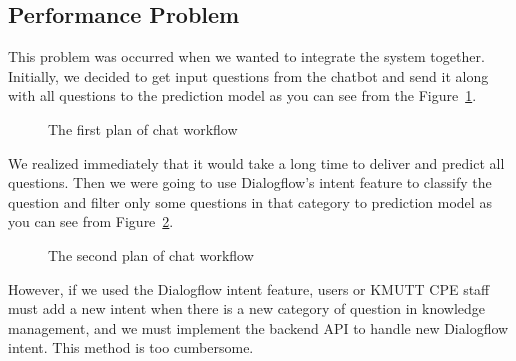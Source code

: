 \documentclass[12pt,oneside,openright,a4paper]{cpe-english-project}
\begin{document}
\subsection{Performance Problem}
This problem was occurred when we wanted to integrate the system together. Initially, we decided to
get input questions from the chatbot and send it along with all questions to the prediction model
as you can see from the Figure~\ref*{fig:chat_plan_1}.

\begin{figure}[!h]\centering
{}
\caption{The first plan of chat workflow}
\label{fig:chat_plan_1}
\end{figure}

We realized immediately that it would take a long time to deliver and predict all questions.
Then we were going to use Dialogflow's intent feature to classify the question and filter
only some questions in that category to prediction model as you can see from
Figure~\ref*{fig:chat_plan_2}.

\begin{figure}[!h]\centering
{}
\caption{The second plan of chat workflow}
\label{fig:chat_plan_2}
\end{figure}

However, if we used the Dialogflow intent feature, users or KMUTT CPE staff must add a new intent
when there is a new category of question in knowledge management, and we must implement the backend
API to handle new Dialogflow intent. This method is too cumbersome.
\end{document}
